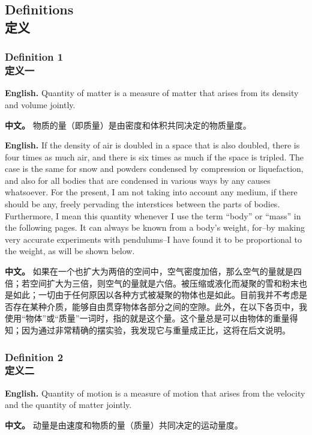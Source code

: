 \subsection*{Definitions\\定义}

\subsubsection*{Definition 1\\定义一}
\noindent\textbf{English.} Quantity of matter is a measure of matter that arises from its density and volume jointly.
\par\noindent\textbf{中文。} 物质的量（即质量）是由密度和体积共同决定的物质量度。
\medskip

\noindent\textbf{English.} If the density of air is doubled in a space that is also doubled, there is four times as much air, and there is six times as much if the space is tripled. The case is the same for snow and powders condensed by compression or liquefaction, and also for all bodies that are condensed in various ways by any causes whatsoever. For the present, I am not taking into account any medium, if there should be any, freely pervading the interstices between the parts of bodies. Furthermore, I mean this quantity whenever I use the term ``body'' or ``mass'' in the following pages. It can always be known from a body's weight, for--by making very accurate experiments with pendulums--I have found it to be proportional to the weight, as will be shown below.
\par\noindent\textbf{中文。} 如果在一个也扩大为两倍的空间中，空气密度加倍，那么空气的量就是四倍；若空间扩大为三倍，则空气的量就是六倍。被压缩或液化而凝聚的雪和粉末也是如此；一切由于任何原因以各种方式被凝聚的物体也是如此。目前我并不考虑是否存在某种介质，能够自由贯穿物体各部分之间的空隙。此外，在以下各页中，我使用“物体”或“质量”一词时，指的就是这个量。这个量总是可以由物体的重量得知；因为通过非常精确的摆实验，我发现它与重量成正比，这将在后文说明。
\medskip

\subsubsection*{Definition 2\\定义二}
\noindent\textbf{English.} Quantity of motion is a measure of motion that arises from the velocity and the quantity of matter jointly.
\par\noindent\textbf{中文。} 动量是由速度和物质的量（质量）共同决定的运动量度。
\medskip

